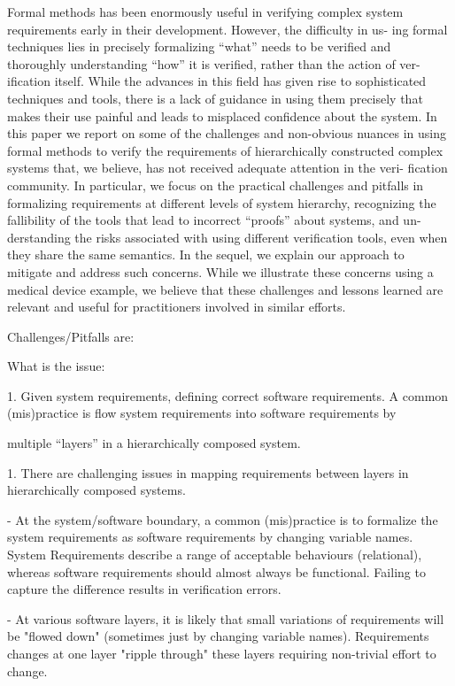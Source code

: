 \iffalse


Formal methods has been enormously useful in verifying complex
system requirements early in their development. However, the difficulty in us-
ing formal techniques lies in precisely formalizing “what” needs to be verified
and thoroughly understanding “how” it is verified, rather than the action of ver-
ification itself. While the advances in this field has given rise to sophisticated
techniques and tools, there is a lack of guidance in using them precisely that
makes their use painful and leads to misplaced confidence about the system.
In this paper we report on some of the challenges and non-obvious nuances in
using formal methods to verify the requirements of hierarchically constructed
complex systems that, we believe, has not received adequate attention in the veri-
fication community. In particular, we focus on the practical challenges and pitfalls
in formalizing requirements at different levels of system hierarchy, recognizing
the fallibility of the tools that lead to incorrect “proofs” about systems, and un-
derstanding the risks associated with using different verification tools, even when
they share the same semantics. In the sequel, we explain our approach to mitigate
and address such concerns. While we illustrate these concerns using a medical
device example, we believe that these challenges and lessons learned are relevant
and useful for practitioners involved in similar efforts.

Challenges/Pitfalls are:

What is the issue:

1. Given system requirements, defining correct software requirements.  A common (mis)practice is flow system requirements into software requirements by

multiple ``layers'' in a hierarchically composed system.


1. There are challenging issues in mapping requirements between layers in hierarchically composed systems.

- At the system/software boundary, a common (mis)practice is to formalize the system requirements as software requirements by changing variable names. System Requirements describe a range of acceptable behaviours (relational), whereas software requirements should almost always be functional. Failing to capture the difference results in verification errors.

- At various software layers, it is likely that small variations of requirements will be "flowed down" (sometimes just by changing variable names).  Requirements changes at one layer "ripple through" these layers requiring non-trivial effort to change.

